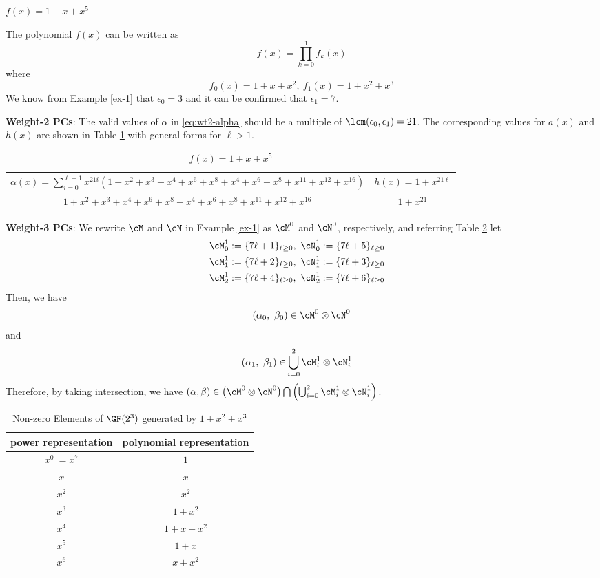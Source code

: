 \begin{example}
$f(x)=1+x+x^5$

The polynomial $f(x)$ can be written as 
$$f(x)=\prod_{k=0}^{1}f_k(x)$$
where 
$$f_0(x)=1+x+x^2,~f_1(x)=1+x^2+x^3$$ 
We know from Example \ref{ex-1} that $\epsilon_0=3$ and it can be confirmed that $\epsilon_1=7$.

\textbf{Weight-2 PCs}: 
The valid values of $\alpha$ in \eqref{eq:wt2-alpha} should be a multiple of $\lcm(\epsilon_0,\epsilon_1)=21$.
The corresponding values for $a(x)$ and $h(x)$ are shown in Table \ref{novelTab1-c} with general forms for $\ell>1$.

\begin{table}[htbp]
\renewcommand{\arraystretch}{1.3}
 \caption{$f(x)=1+x+x^5$}
 \centering
\begin{tabular}{c c } 
\hline
 $\alpha(x)=\sum_{i=0}^{\ell-1} x^{21i}(1+x^2+x^3+x^4+x^6+x^8+x^{4}+x^{6}+x^{8}+x^{11}+x^{12}+x^{16})$ & $h(x)=1+x^{21\ell}$ \\ [0.5ex] 
\hline\hline
$1+x^2+x^3+x^4+x^6+x^8+x^{4}+x^{6}+x^{8}+x^{11}+x^{12}+x^{16}$ & $1+x^{21}$\\ 
\end{tabular}
 \label{novelTab1-c}
\end{table}

\textbf{Weight-3 PCs}:
We rewrite $\cM$ and $\cN$ in Example \ref{ex-1} as $\cM^0$ and $\cN^0$, respectively,
and referring Table \ref{novelTabWt3-5} let
\begin{align}
	\cM_0^1 &:= \{7\ell + 1\}_{\ell \geq 0},~\cN_0^1 := \{7\ell + 5\}_{\ell \geq 0}\cr
	\cM_1^1 &:= \{7\ell + 2\}_{\ell \geq 0},~\cN_1^1 := \{7\ell + 3\}_{\ell \geq 0}\cr
	\cM_2^1 &:= \{7\ell + 4\}_{\ell \geq 0},~\cN_2^1 := \{7\ell + 6\}_{\ell \geq 0}
\end{align}
Then, we have
\[
(\alpha_0,~\beta_0) \in \cM^0\otimes\cN^0 
\]
and
\begin{equation*}
\begin{split}
(\alpha_1,~\beta_1) \in &\bigcup_{i=0}^2 \cM_i^1\otimes\cN_i^1 
\end{split}
\end{equation*}
Therefore, by taking intersection, we have $(\alpha,\beta) \in \left(\cM^0\otimes\cN^0\right)\bigcap\left(\bigcup_{i=0}^2 \cM_i^1\otimes\cN_i^1 \right) $.

\begin{table}[htbp]
 \caption{Non-zero Elements of $\GF (2^3)$ generated by $1+x^2+x^3$}
\centering
 \begin{tabular}{c c} 
 \hline
 power representation & polynomial representation \\ [0.5ex] 
 \hline\hline
$x^0~=x^7$ & $1$\\
\hline
$x$ & $x$\\
\hline
$x^2$ &  $x^2$\\
\hline
$x^3$ &  $1+x^2$\\
\hline
$x^4$ &  $1+x+x^2$\\
\hline
$x^5$ &  $1+x$\\
\hline
$x^6$ &  $x+x^2$\\
\hline
 \end{tabular}
 \label{novelTabWt3-5}
\end{table}


\end{example}
